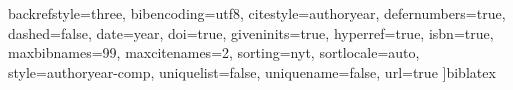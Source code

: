 	backrefstyle=three,		%
	bibencoding=utf8,		%
	citestyle=authoryear,	%
	defernumbers=true,		%
	dashed=false,			%
	date=year,				%
	doi=true,				%
	giveninits=true,		%
	hyperref=true,			%
	isbn=true,				%
	maxbibnames=99,			%
	maxcitenames=2,			%
	sorting=nyt,			%
	sortlocale=auto,		%
	style=authoryear-comp,		%
	uniquelist=false,		%
	uniquename=false,		%
	url=true				%
]{biblatex}
\usepackage[
	autostyle=true,			%
	strict=true				%
]{csquotes}					%
\usepackage[
]{acro}						%
\usepackage{imakeidx}		%
\usepackage[
	intoc,					%
	nomentbl,				%
	noprefix,				%
]{nomencl}					%
\usepackage{listings}		%
\usepackage{xurl}			%


\usepackage[margin=2cm]{geometry}
\usepackage{algpseudocode}
\usepackage{algorithmicx}
\usepackage{algorithm}
\usepackage{animate}
\usepackage{subfig}


